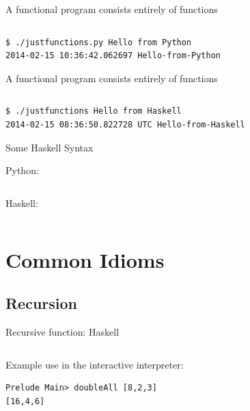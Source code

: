 \documentclass[mathserif]{beamer}
\begin{document}
\begin{frame}[fragile]{A functional program consists entirely of functions}

  \inputminted[firstline=6,lastline=15]{python}{code/python/justfunctions.py}

  \begin{verbatim}
$ ./justfunctions.py Hello from Python
2014-02-15 10:36:42.062697 Hello-from-Python
  \end{verbatim}

\end{frame}

\begin{frame}[fragile]{A functional program consists entirely of functions}

  \inputminted[firstline=5]{haskell}{code/haskell/justfunctions.hs}

  \begin{verbatim}
$ ./justfunctions Hello from Haskell
2014-02-15 08:36:50.822728 UTC Hello-from-Haskell
  \end{verbatim}

\end{frame}

\begin{frame}{Some Haskell Syntax}

  Python:
  \inputminted[fontsize=\large,firstline=11,lastline=12]{python}{code/python/justfunctions.py}
  \vskip5mm
  Haskell:
  \inputminted[fontsize=\large,firstline=11,lastline=13]{haskell}{code/haskell/justfunctions.hs}

\end{frame}

\section{Common Idioms}
\subsection{Recursion}

\begin{frame}[fragile]{Recursive function: Haskell}

  \inputminted[fontsize=\Large,lastline=3]{haskell}{code/haskell/doubleall_recursion.hs}

  \vskip5mm

Example use in the interactive interpreter:
  \begin{verbatim}
Prelude Main> doubleAll [8,2,3]
[16,4,6]
  \end{verbatim}

\end{frame}
\end{document}
